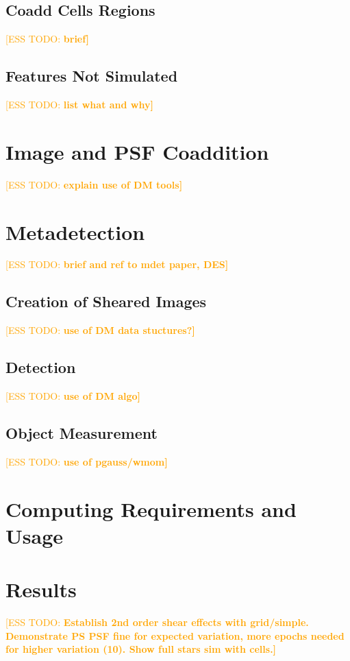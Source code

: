 \documentclass[iop, twocolappendix, appendixfloats, numberedappendix, apj]{hackemulateapj}
\newcommand{\esstodo}[1]{\textcolor{orange}{[ESS TODO: \bf #1]}}
\begin{document}
\subsection{Coadd Cells Regions} \label{sec:simfeatures:cells}
\esstodo{brief}

\subsection{Features Not Simulated} \label{sec:notincluded}
\esstodo{list what and why}

\section{Image and PSF Coaddition} \label{sec:coadding}
\esstodo{explain use of DM tools}

\section{Metadetection} \label{sec:mdet}
\esstodo{brief and ref to mdet paper, DES}

\subsection{Creation of Sheared Images} \label{sec:mdet:sheared}
\esstodo{use of DM data stuctures?}
\subsection{Detection} \label{sec:mdet:detect}
\esstodo{use of DM algo}
\subsection{Object Measurement} \label{sec:mdet:meas}
\esstodo{use of pgauss/wmom}

\section{Computing Requirements and Usage} \label{sec:timing}

\section{Results} \label{sec:results}

\esstodo{Establish 2nd order shear effects with grid/simple.  Demonstrate PS PSF fine for expected variation, more epochs needed for higher variation (10). Show full stars sim with cells.}
\end{document}
